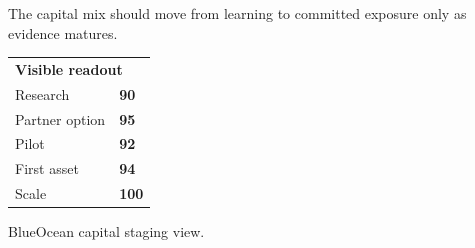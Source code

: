 \documentclass[10pt,a4paper]{article}
\begin{document}
\vspace{1pt}\noindent\begin{minipage}[t]{0.56\linewidth}
{\footnotesize\color{BOText} The capital mix should move from learning to committed exposure only as evidence matures.}\par
\end{minipage}\hfill\begin{minipage}[t]{0.36\linewidth}
{\scriptsize\color{BOText}\begin{tabular}{p{31mm}>{\raggedleft\arraybackslash}p{18mm}}
\multicolumn{2}{l}{\textcolor{BOGreen}{\bfseries Visible readout}}\\[2pt]
Research & \textbf{90}\\[1pt]
Partner option & \textbf{95}\\[1pt]
Pilot & \textbf{92}\\[1pt]
First asset & \textbf{94}\\[1pt]
Scale & \textbf{100}\\[1pt]
\end{tabular}}\par
\end{minipage}\par\vspace{1pt}
\par
{\scriptsize\color{BOMuted} BlueOcean capital staging view.}\par
\end{document}
